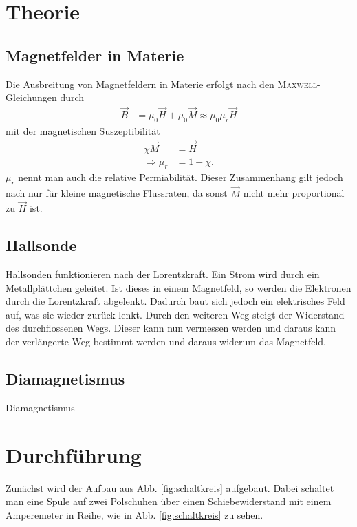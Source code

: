 \documentclass[12pt,a4paper,titlepage,headinclude,bibtotoc]{scrartcl}
\begin{document}
\section{Theorie}
\label{sec:theorie}
\subsection{Magnetfelder in Materie}
Die Ausbreitung von Magnetfeldern in Materie erfolgt nach den \textsc{Maxwell}-Gleichungen durch
\begin{align}
	\vec B&=\mu_0\vec H+\mu_0\vec M\approx\mu_0\mu_r\vec H
\end{align}
mit der magnetischen Suszeptibilität
\begin{align}
	\chi\vec M&=\vec H\\
	\Rightarrow\mu_r&=1+\chi .
\end{align}
$\mu _r$ nennt man auch die relative Permiabilität.
Dieser Zusammenhang gilt jedoch nach \cite[S. 112]{demtroeder2} nur für kleine magnetische Flussraten, da sonst $\vec M$ nicht mehr proportional zu $\vec H$ ist.

\subsection{Hallsonde}
Hallsonden funktionieren nach der Lorentzkraft.
Ein Strom wird durch ein Metallplättchen geleitet.
Ist dieses in einem Magnetfeld, so werden die Elektronen durch die Lorentzkraft abgelenkt.
Dadurch baut sich jedoch ein elektrisches Feld auf, was sie wieder zurück lenkt.
Durch den weiteren Weg steigt der Widerstand des durchflossenen Wegs.
Dieser kann nun vermessen werden und daraus kann der verlängerte Weg bestimmt werden und daraus widerum das Magnetfeld.

\subsection{Diamagnetismus}
Diamagnetismus 

\section{Durchführung}
\label{sec:durchfuehrung}
Zunächst wird der Aufbau aus Abb. \ref{fig:schaltkreis} aufgebaut.
Dabei schaltet man eine Spule auf zwei Polschuhen über einen Schiebewiderstand mit einem Amperemeter in Reihe, wie in Abb. \ref{fig:schaltkreis} zu sehen.
\end{document}

